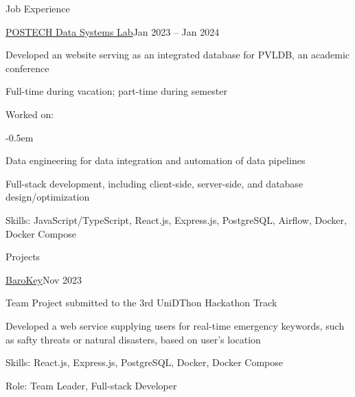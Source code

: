 \documentclass{resume}
\begin{document}
\begin{rSection}{Job Experience}
    \begin{rSubsection}{\href{https://dslab.postech.ac.kr/}{POSTECH Data
        Systems Lab}}{Jan 2023 -- Jan 2024}

        {\bfseries{}}

        \item Developed an website serving as an integrated database for PVLDB,
            an academic conference

        \item Full-time during vacation; part-time during semester

        \item Worked on:

        \vspace{-0.5em}
        \begin{list}{--}{}
            \itemsep -0.5em

            \item Data engineering for data integration and automation of data
                pipelines

            \item Full-stack development, including client-side, server-side,
                and database design/optimization 
        \end{list}

        \item Skills: JavaScript/TypeScript, React.js, Express.js, PostgreSQL,
            Airflow, Docker, Docker Compose
    \end{rSubsection}
\end{rSection}

\begin{rSection}{Projects}

    \begin{rSubsection}{\href{https://github.com/UniD3-Hackathon-Team4/barokey}
        {BaroKey}}{Nov 2023}

        Team Project submitted to the 3rd UniDThon Hackathon Track

        \item Developed a web service supplying users for real-time emergency
            keywords, such as safty threats or natural disasters, based on
            user's location

        \item Skills: React.js, Express.js, PostgreSQL, Docker, Docker Compose

        \item Role: Team Leader, Full-stack Developer
    \end{rSubsection}
\end{rSection}
\end{document}
